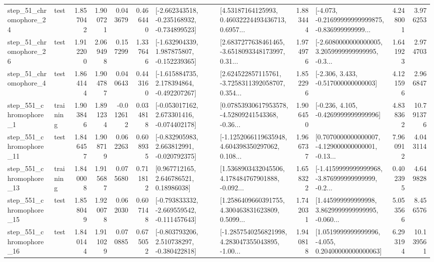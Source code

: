 \begin{tabular}{llrrrrllrlrr}
   step\_51\_chromophore\_24 &      test &      1.857042 &    1.900721 &      0.043679 &  0.466440 &  [-2.662343518, -0.235168932, -0.734899523] &  [4.53187164125993, 0.46032224493436713, 0.6957... &       1.883444 &  [-4.073, -0.21699999999999875, -0.836999999999... &            4.248001 &          3.976253 \\
   step\_51\_chromophore\_26 &      test &      1.912200 &    2.069498 &      0.157299 &  1.337646 &   [-1.632904339, 1.987875807, -0.152239365] &  [2.6837277638461465, -3.6518093348173997, 0.31... &       1.974976 &  [-2.6080000000000005, 3.2059999999999995, -0.3... &            1.641923 &          2.974703 \\
    step\_51\_chromophore\_4 &      test &      1.864144 &    1.904787 &      0.040643 &  0.443160 &   [-1.615884735, 2.178394864, -0.492207267] &  [2.624522857115761, -3.7258311392058707, 0.354... &       1.852296 &                [-2.306, 3.433, -0.517000000000003] &            4.121596 &          2.966847 \\
   step\_551\_chromophore\_1 &  training &      1.903846 &    1.891234 &     -0.012612 &  0.034818 &   [-0.053017162, 2.673301416, -0.074402178] &  [0.07853930617953578, -4.52809241543368, -0.36... &       1.906450 &               [-0.236, 4.105, -0.4269999999999996] &            4.838362 &         10.791376 \\
  step\_551\_chromophore\_11 &      test &      1.846457 &    1.908719 &      0.062263 &  0.608935 &   [-0.832905983, 2.663812991, -0.020792375] &  [-1.1252066119635948, 4.604398350297062, 0.108... &       1.966737 &  [0.7070000000000007, -4.129000000000001, -0.13... &            7.960912 &          4.043114 \\
  step\_551\_chromophore\_13 &  training &      1.840008 &    1.915687 &      0.075680 &  0.711812 &      [0.967712165, 2.646786521, 0.18986038] &  [1.5368903432045506, 4.178484767901888, -0.092... &       1.658322 &  [-1.4159999999999968, -3.876999999999999, -0.2... &            0.402395 &          4.649828 \\
  step\_551\_chromophore\_15 &      test &      1.858049 &    1.920078 &      0.062030 &  0.607148 &  [-0.793833332, -2.669559542, -0.111457643] &  [1.2586409660391755, 4.300463831623809, 0.5099... &       1.742031 &  [1.445999999999998, 3.8629999999999995, -0.060... &            5.053566 &          8.456576 \\
  step\_551\_chromophore\_16 &      test &      1.840144 &    1.911029 &      0.070885 &  0.675052 &   [-0.803793206, 2.510738297, -0.380422818] &  [-1.2857540256821998, 4.283047355043895, -1.00... &       1.940818 &  [1.0519999999999996, -4.055, 0.20400000000000063] &            6.293194 &         10.139561 \\

\end{tabular}
